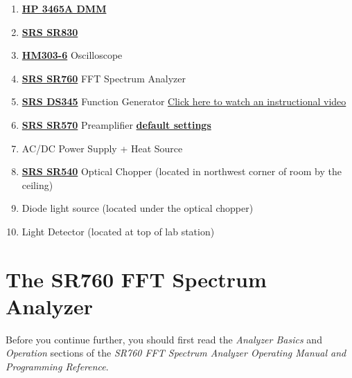 \documentclass{../lab}
\begin{document}
\begin{enumerate}
    \item \href{http://physics111.lib.berkeley.edu/Physics111/Reprints/LLS/11-HP3465A.pdf}{\textbf{HP 3465A DMM}}

    \item \href{http://physics111.lib.berkeley.edu/Physics111/Reprints/LLS/07-SR830.pdf}{\textbf{SRS SR830}}
    
    \item \href{http://physics111.lib.berkeley.edu/Physics111/Reprints/LLS/HM303-6_engl.pdf}{\textbf{HM303-6}} Oscilloscope

    \item \href{http://physics111.lib.berkeley.edu/Physics111/Reprints/LLS/06-SR760.pdf}{\textbf{SRS SR760}} FFT Spectrum Analyzer

    \item \href{http://physics111.lib.berkeley.edu/Physics111/Reprints/LLS/09-DS345.pdf}{\textbf{SRS DS345}} Function Generator \href{https://youtu.be/PrM8DHFOFS0}{Click here to watch an instructional video}

    \item \href{http://physics111.lib.berkeley.edu/Physics111/Reprints/LLS/05-SR570.pdf}{\textbf{SRS SR570}} Preamplifier \href{http://experimentationlab.berkeley.edu/defaultsettings}{\textbf{default settings}}

    \item AC/DC Power Supply + Heat Source

    \item \href{http://physics111.lib.berkeley.edu/Physics111/Reprints/LLS/10-SR540.pdf}{\textbf{SRS SR540}} Optical Chopper (located in northwest corner of room by the ceiling)

    \item Diode light source (located under the optical chopper)

    \item Light Detector (located at top of lab station)

\end{enumerate}

\section{The SR760 FFT Spectrum Analyzer}

Before you continue further, you should first read the \emph{Analyzer Basics} and \emph{Operation} sections of the \emph{SR760 FFT Spectrum Analyzer Operating Manual and Programming Reference}.
\end{document}

